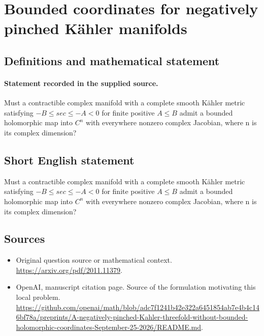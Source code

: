 \documentclass[11pt]{article}
\begin{document}
\section*{Bounded coordinates for negatively pinched Kähler manifolds}\label{30007149}
\subsection{Definitions and mathematical statement}
\paragraph{Statement recorded in the supplied source.}
Must a contractible complex manifold with a complete smooth Kähler metric satisfying $-B\leq sec\leq -A<0$ for finite positive $A\leq B$ admit a bounded holomorphic map into $C^{n}$ with everywhere nonzero complex Jacobian, where n is its complex dimension?
\subsection{Short English statement}
Must a contractible complex manifold with a complete smooth Kähler metric satisfying $-B\leq sec\leq -A<0$ for finite positive $A\leq B$ admit a bounded holomorphic map into $C^{n}$ with everywhere nonzero complex Jacobian, where n is its complex dimension?
\subsection{Sources}
\begin{itemize}
\item[S1] Original question source or mathematical context.
\url{https://arxiv.org/pdf/2011.11379}.
\item[S2] OpenAI, manuscript citation page. Source of the formulation motivating this local problem.
\url{https://github.com/openai/math/blob/adc7f1241b42e322a6451854ab7e4b4c146bf78a/preprints/A-negatively-pinched-Kahler-threefold-without-bounded-holomorphic-coordinates-September-25-2026/README.md}.
\end{itemize}
\end{document}
